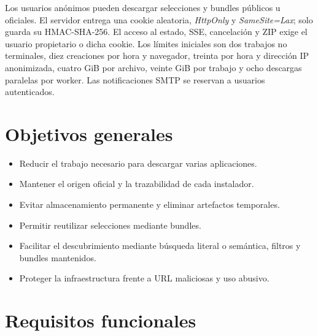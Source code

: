 Los usuarios anónimos pueden descargar selecciones y bundles públicos u oficiales. El servidor entrega una cookie  aleatoria, \emph{HttpOnly} y \emph{SameSite=Lax}; solo guarda su HMAC-SHA-256. El acceso al estado, SSE, cancelación y ZIP exige el usuario propietario o dicha cookie. Los límites iniciales son dos trabajos no terminales, diez creaciones por hora y navegador, treinta por hora y dirección IP anonimizada, cuatro GiB por archivo, veinte GiB por trabajo y ocho descargas paralelas por worker. Las notificaciones SMTP se reservan a usuarios autenticados.

\section{Objetivos generales}

\begin{itemize}
	\item Reducir el trabajo necesario para descargar varias aplicaciones.
	\item Mantener el origen oficial y la trazabilidad de cada instalador.
	\item Evitar almacenamiento permanente y eliminar artefactos temporales.
	\item Permitir reutilizar selecciones mediante bundles.
	\item Facilitar el descubrimiento mediante búsqueda literal o semántica, filtros y bundles mantenidos.
	\item Proteger la infraestructura frente a URL maliciosas y uso abusivo.
\end{itemize}

\section{Requisitos funcionales}

